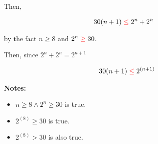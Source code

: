 \documentclass[12pt]{article}
\begin{document}
\begin{enumerate}[a.]
\begin{mdframed}
        \bigskip

        Then,

        \begin{align}
            30(n+1) &\color{red}\leq\color{black} 2^n + 2^n
        \end{align}

        by the fact $n \geq 8$ and $2^n \color{red}\geq\color{black} 30$.

        \bigskip

        Then, since $2^n + 2^n = 2^{n+1}$

        \begin{align}
            30(n+1) \color{red}\leq\color{black} 2^{(n+1)}
        \end{align}

    \end{mdframed}

    \textbf{Notes:}
    \begin{itemize}
        \item $n \geq 8 \land 2^n \geq 30$ is true.
        \item $2^{(8)} \geq 30$ is true.
        \item $2^{(8)} > 30$ is also true.
    \end{itemize}


\end{enumerate}
\end{document}
